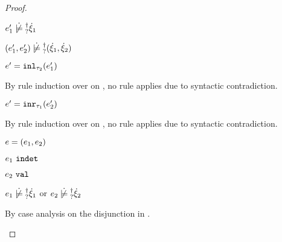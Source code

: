 \begin{proof}
\begin{byCases}
\begin{byCases}
\begin{byCases}
\begin{byCases}
\begin{byCases}
\begin{byCases}
\begin{byCases}
\begin{pfsteps*}
                \item $\cnotsatisfyormay{e_1'}{\hxi_1}$  
                \item $\cnotsatisfyormay{\hpair{e_1'}{e_2'}}{\cpair{\hxi_1}{\hxi_2}}$ 
                \end{pfsteps*} 
              \end{byCases}
              \item[\text{(\ref{rule:VInl})}] 
              \begin{pfsteps*} 
              \item $e'=\mathtt{inl}_{\tau_2}({e_1'})$ 
              \end{pfsteps*}
              By rule induction over  on , no rule applies due to syntactic contradiction.
              \item[\text{(\ref{rule:VInr})}] 
              \begin{pfsteps*} 
              \item $e'=\mathtt{inr}_{\tau_1}({e_2'})$ 
              \end{pfsteps*}
              By rule induction over  on , no rule applies due to syntactic contradiction.
            \end{byCases}
          \end{byCases}
        \end{byCases}
        \item[\text{(\ref{rule:IPairL})}] 
        \begin{pfsteps*}
        \item $e=(e_1 , e_2)$ 
        \item $e_1 ~\mathtt{indet}$  
        \item $e_2 ~\mathtt{val}$  
        \item $\cnotsatisfyormay{e_1}{\hxi_1}$ or $\cnotsatisfyormay{e_2}{\hxi_2}$  
        \end{pfsteps*}
        By case analysis on the disjunction in .
        \begin{byCases}

\end{byCases}
\end{byCases}
\end{byCases}
\end{byCases}
\end{proof}
